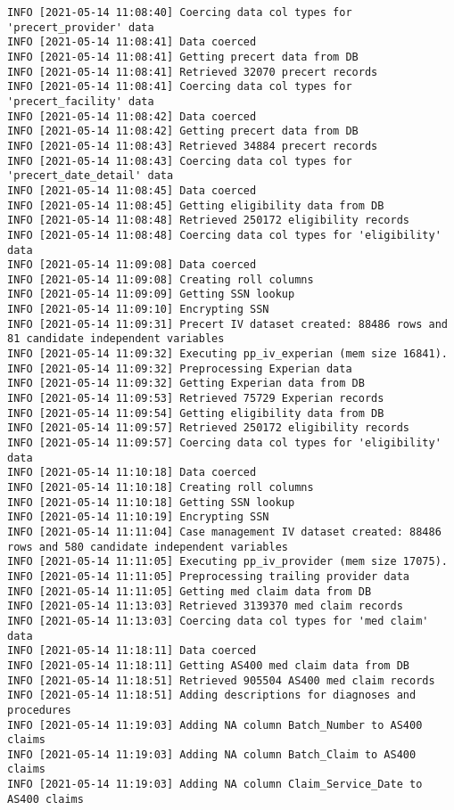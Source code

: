 \documentclass[
]{book}
\begin{document}
\begin{verbatim}
INFO [2021-05-14 11:08:40] Coercing data col types for 'precert_provider' data
INFO [2021-05-14 11:08:41] Data coerced
INFO [2021-05-14 11:08:41] Getting precert data from DB
INFO [2021-05-14 11:08:41] Retrieved 32070 precert records
INFO [2021-05-14 11:08:41] Coercing data col types for 'precert_facility' data
INFO [2021-05-14 11:08:42] Data coerced
INFO [2021-05-14 11:08:42] Getting precert data from DB
INFO [2021-05-14 11:08:43] Retrieved 34884 precert records
INFO [2021-05-14 11:08:43] Coercing data col types for 'precert_date_detail' data
INFO [2021-05-14 11:08:45] Data coerced
INFO [2021-05-14 11:08:45] Getting eligibility data from DB
INFO [2021-05-14 11:08:48] Retrieved 250172 eligibility records
INFO [2021-05-14 11:08:48] Coercing data col types for 'eligibility' data
INFO [2021-05-14 11:09:08] Data coerced
INFO [2021-05-14 11:09:08] Creating roll columns
INFO [2021-05-14 11:09:09] Getting SSN lookup
INFO [2021-05-14 11:09:10] Encrypting SSN
INFO [2021-05-14 11:09:31] Precert IV dataset created: 88486 rows and 81 candidate independent variables
INFO [2021-05-14 11:09:32] Executing pp_iv_experian (mem size 16841).
INFO [2021-05-14 11:09:32] Preprocessing Experian data
INFO [2021-05-14 11:09:32] Getting Experian data from DB
INFO [2021-05-14 11:09:53] Retrieved 75729 Experian records
INFO [2021-05-14 11:09:54] Getting eligibility data from DB
INFO [2021-05-14 11:09:57] Retrieved 250172 eligibility records
INFO [2021-05-14 11:09:57] Coercing data col types for 'eligibility' data
INFO [2021-05-14 11:10:18] Data coerced
INFO [2021-05-14 11:10:18] Creating roll columns
INFO [2021-05-14 11:10:18] Getting SSN lookup
INFO [2021-05-14 11:10:19] Encrypting SSN
INFO [2021-05-14 11:11:04] Case management IV dataset created: 88486 rows and 580 candidate independent variables
INFO [2021-05-14 11:11:05] Executing pp_iv_provider (mem size 17075).
INFO [2021-05-14 11:11:05] Preprocessing trailing provider data
INFO [2021-05-14 11:11:05] Getting med claim data from DB
INFO [2021-05-14 11:13:03] Retrieved 3139370 med claim records
INFO [2021-05-14 11:13:03] Coercing data col types for 'med claim' data
INFO [2021-05-14 11:18:11] Data coerced
INFO [2021-05-14 11:18:11] Getting AS400 med claim data from DB
INFO [2021-05-14 11:18:51] Retrieved 905504 AS400 med claim records
INFO [2021-05-14 11:18:51] Adding descriptions for diagnoses and procedures
INFO [2021-05-14 11:19:03] Adding NA column Batch_Number to AS400 claims
INFO [2021-05-14 11:19:03] Adding NA column Batch_Claim to AS400 claims
INFO [2021-05-14 11:19:03] Adding NA column Claim_Service_Date to AS400 claims

\end{verbatim}
\end{document}
